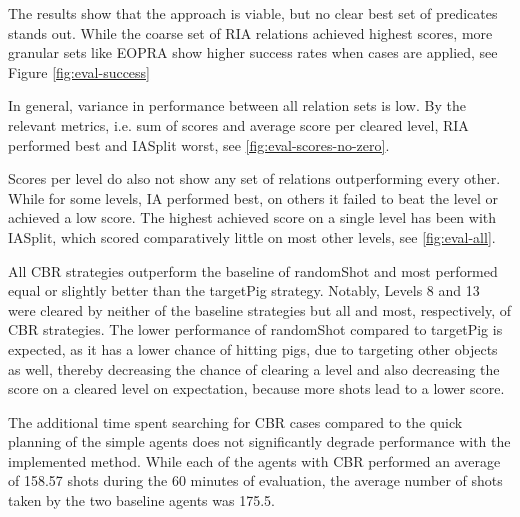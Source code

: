 The results show that the approach is viable, but no clear best set of predicates stands out. While the coarse set of \ac{RIA} relations achieved highest scores, more granular sets like \ac{EOPRA} show higher success rates when cases are applied, see Figure \ref{fig:eval-success}


In general, variance in performance between all relation sets is low. By the relevant metrics, i.e. sum of scores and average score per cleared level, \ac{RIA} performed best and \ac{IASplit} worst, see \ref{fig:eval-scores-no-zero}.

Scores per level do also not show any set of relations outperforming every other. While for some levels, \ac{IA} performed best, on others it failed to beat the level or achieved a low score. The highest achieved score on a single level has been with \ac{IASplit}, which scored comparatively little on most other levels, see \ref{fig:eval-all}.

All \ac{CBR} strategies outperform the baseline of randomShot and most performed equal or slightly better than the targetPig strategy. Notably, Levels 8 and 13 were cleared by neither of the baseline strategies but all and most, respectively, of \ac{CBR} strategies.
The lower performance of randomShot compared to targetPig is expected, as it has a lower chance of hitting pigs, due to targeting other objects as well, thereby decreasing the chance of clearing a level and also decreasing the score on a cleared level on expectation, because more shots lead to a lower score.


The additional time spent searching for CBR cases compared to the quick planning of the simple agents does not significantly degrade performance with the implemented method. While each of the agents with \ac{CBR} performed an average of 158.57 shots during the 60 minutes of evaluation, the average number of shots taken by the two baseline agents was 175.5.